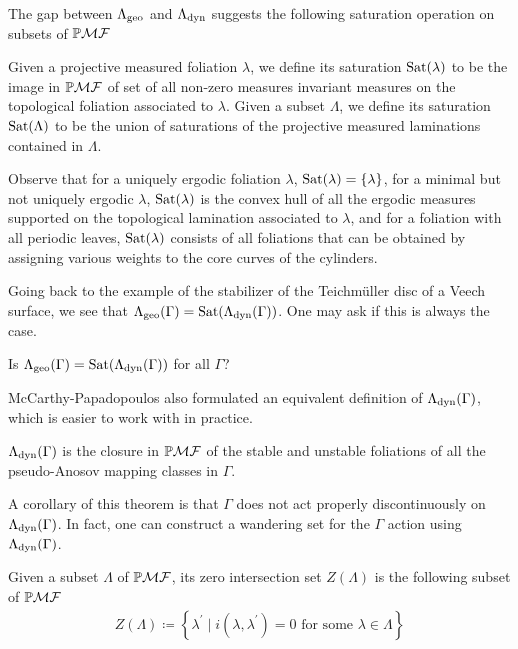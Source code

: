 \documentclass[12pt, reqno]{amsart}
\begin{document}
The gap between $\Lambda_{\mathrm{geo}}$ and $\Lambda_{\mathrm{dyn}}$ suggests the following saturation operation on subsets of $\mathbb{P}\mathcal{MF}$
\begin{definition}[Saturation]
  Given a projective measured foliation $\lambda$, we define its saturation $\mathrm{Sat}(\lambda)$ to be the image in $\mathbb{P}\mathcal{MF}$ of set of all non-zero measures invariant measures on the topological foliation associated to $\lambda$.
  Given a subset $\Lambda$, we define its saturation $\mathrm{Sat}(\Lambda)$ to be the union of saturations of the projective measured laminations contained in $\Lambda$.
\end{definition}
Observe that for a uniquely ergodic foliation $\lambda$, $\mathrm{Sat}(\lambda) = \{\lambda\}$, for a minimal but not uniquely ergodic $\lambda$, $\mathrm{Sat}(\lambda)$ is the convex hull of all the ergodic measures supported on the topological lamination associated to $\lambda$, and for a foliation with all periodic leaves, $\mathrm{Sat}(\lambda)$ consists of all foliations that can be obtained by assigning various weights to the core curves of the cylinders.

Going back to the example of the stabilizer of the Teichmüller disc of a Veech surface, we see that $\Lambda_{\mathrm{geo}}(\Gamma) = \mathrm{Sat}(\Lambda_{\mathrm{dyn}}(\Gamma))$.
One may ask if this is always the case.
\begin{question}
  Is $\Lambda_{\mathrm{geo}}(\Gamma) = \mathrm{Sat}(\Lambda_{\mathrm{dyn}}(\Gamma))$ for all $\Gamma$?
\end{question}

McCarthy-Papadopoulos also formulated an equivalent definition of $\Lambda_{\mathrm{dyn}}(\Gamma)$, which is easier to work with in practice.

\begin{untheorem}
  \label{thm:equivalence-of-limit-sets}
  $\Lambda_{\mathrm{dyn}}(\Gamma)$ is the closure in $\mathbb{P}\mathcal{MF}$ of the stable and unstable foliations of all the pseudo-Anosov mapping classes in $\Gamma$.
\end{untheorem}
A corollary of this theorem is that $\Gamma$ does not act properly discontinuously on $\Lambda_{\mathrm{dyn}}(\Gamma)$.
In fact, one can construct a wandering set for the $\Gamma$ action using $\Lambda_{\mathrm{dyn}}(\Gamma)$.
\begin{definition}
  Given a subset $\Lambda$ of $\mathbb{P}\mathcal{MF}$, its zero intersection set $Z(\Lambda)$ is the following subset of $\mathbb{P}\mathcal{MF}$
  \begin{align*}
    Z(\Lambda) \coloneqq \left\{ \lambda^{\prime} \mid i(\lambda, \lambda^{\prime}) = 0 \text{ for some $\lambda \in \Lambda$} \right\}
  \end{align*}
\end{definition}
\end{document}
